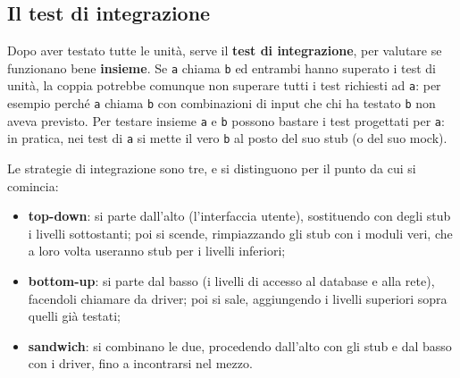 \subsection{Il test di integrazione}

Dopo aver testato tutte le unità, serve il \textbf{test di integrazione}, per valutare se funzionano bene
\textbf{insieme}. Se \texttt{a} chiama \texttt{b} ed entrambi hanno superato i test di unità, la coppia potrebbe
comunque non superare tutti i test richiesti ad \texttt{a}: per esempio perché \texttt{a} chiama \texttt{b} con
combinazioni di input che chi ha testato \texttt{b} non aveva previsto. Per testare insieme \texttt{a} e \texttt{b}
possono bastare i test progettati per \texttt{a}: in pratica, nei test di \texttt{a} si mette il vero \texttt{b} al posto
del suo stub (o del suo mock).

Le strategie di integrazione sono tre, e si distinguono per il punto da cui si comincia:

\begin{itemize}
  \item \textbf{top-down}: si parte dall'alto (l'interfaccia utente), sostituendo con degli stub i livelli sottostanti;
        poi si scende, rimpiazzando gli stub con i moduli veri, che a loro volta useranno stub per i livelli inferiori;
  \item \textbf{bottom-up}: si parte dal basso (i livelli di accesso al database e alla rete), facendoli chiamare da
        driver; poi si sale, aggiungendo i livelli superiori sopra quelli già testati;
  \item \textbf{sandwich}: si combinano le due, procedendo dall'alto con gli stub e dal basso con i driver, fino a
        incontrarsi nel mezzo.
\end{itemize}

